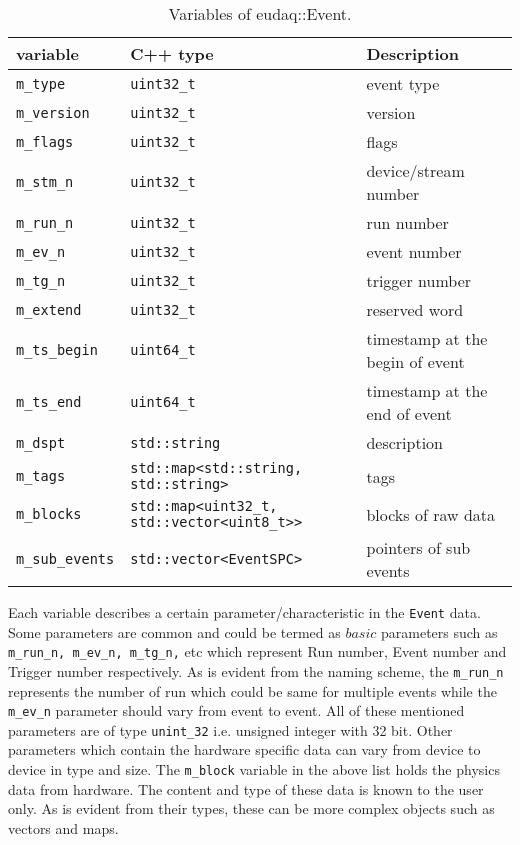 \begin{table}[h]
\centering
\small
\begin{tabular}{ l | l | l }
  \textbf{variable} & \textbf{C++ type} & \textbf{Description}\\
  \hline
  \texttt{m\_type} & \texttt{uint32\_t} & event type\\
  \texttt{m\_version} & \texttt{uint32\_t} & version\\
  \texttt{m\_flags} & \texttt{uint32\_t} & flags\\
  \texttt{m\_stm\_n} & \texttt{uint32\_t} & device/stream number\\
  \texttt{m\_run\_n} & \texttt{uint32\_t} & run number\\
  \texttt{m\_ev\_n} & \texttt{uint32\_t} & event number\\
  \texttt{m\_tg\_n} & \texttt{uint32\_t} & trigger number\\
  \texttt{m\_extend} & \texttt{uint32\_t} & reserved word\\
  \texttt{m\_ts\_begin} & \texttt{uint64\_t} & timestamp at the begin of event\\
  \texttt{m\_ts\_end} & \texttt{uint64\_t} & timestamp at the end of event\\
  \texttt{m\_dspt} & \texttt{std::string} & description\\
  \texttt{m\_tags} & \texttt{std::map<std::string, std::string>} & tags\\
  \texttt{m\_blocks} & \texttt{std::map<uint32\_t, std::vector<uint8\_t>>} & blocks of raw data\\
  \texttt{m\_sub\_events} & \texttt{std::vector<EventSPC>} & pointers of sub events\\
\end{tabular}
\caption{Variables of eudaq::Event.}
\label{tab:eventdata2}
\end{table}

 Each variable describes a certain parameter/characteristic in the \lstinline[style=cpp]{Event} data. Some parameters are common and could be termed as $basic$ parameters such as \lstinline[style=cpp]{m_run_n, m_ev_n, m_tg_n,} etc which represent Run number, Event number and Trigger number respectively. As is evident from the naming scheme, the \lstinline[style=cpp]{m_run_n} represents the number of run which could be same for multiple events while the \lstinline[style=cpp]{m_ev_n} parameter should vary from event to event. All of these mentioned parameters are of type \lstinline[style=cpp]{unint_32} i.e. unsigned integer with 32 bit. Other parameters which contain the hardware specific data can vary from device to device in type and size. The \lstinline[style=cpp]{m_block} variable in the above list holds the physics data from hardware. The content and type of these data is known to the user only. As is evident from their types, these can be more complex objects such as vectors and maps. %

